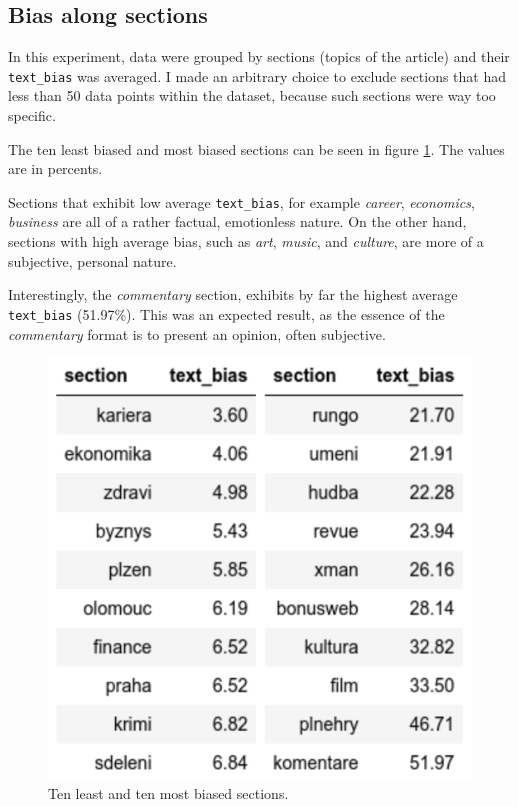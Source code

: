 \newpage
\subsection{Bias along sections}\label{commentary_bias}
In this experiment, data were grouped by sections (topics of the article) and their \verb|text_bias| was averaged. I made an arbitrary choice to exclude sections that had less than 50 data points within the dataset, because such sections were way too specific.

The ten least biased and most biased sections can be seen in figure \ref{fig:sections}. The values are in percents.


Sections that exhibit low average \verb|text_bias|, for example \textit{career}, \textit{economics}, \textit{business} are all of a rather factual, emotionless nature.
On the other hand, sections with high average bias, such as \textit{art}, \textit{music}, and \textit{culture}, are more of a subjective, personal nature.

Interestingly, the \textit{commentary} section, exhibits by far the highest average \verb|text_bias| (51.97\%). This was an expected result, as the essence of the \textit{commentary} format is to present an opinion, often subjective.

\begin{figure}

  \includegraphics[scale=0.2]{my_modules/multimedia/inference/sections.jpg}
  \caption{Ten least and ten most biased sections.}
  \label{fig:sections}
\end{figure}

